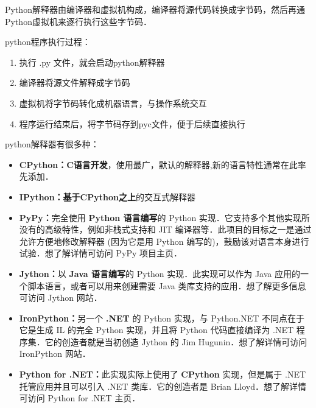 
\begin{issues}
\issueTODO
\end{issues}


Python解释器由编译器和虚拟机构成，编译器将源代码转换成字节码，然后再通Python虚拟机来逐行执行这些字节码．

python程序执行过程：

\begin{enumerate}
\item 执行 .py 文件，就会启动python解释器

\item 编译器将源文件解释成字节码

\item 虚拟机将字节码转化成机器语言，与操作系统交互

\item 程序运行结束后，将字节码存到pyc文件，便于后续直接执行
\end{enumerate}

python解释器有很多种：

\begin{itemize}
\item \textbf{CPython：}\textbf{C语言开发}，使用最广，默认的解释器,新的语言特性通常在此率先添加．

\item \textbf{IPython：}\textbf{基于CPython之上}的交互式解释器

\item \textbf{PyPy：}完全使用 \textbf{Python 语言编写}的 Python 实现．它支持多个其他实现所没有的高级特性，例如非栈式支持和 JIT 编译器等．此项目的目标之一是通过允许方便地修改解释器 (因为它是用 Python 编写的)，鼓励该对语言本身进行试验．想了解详情可访问 PyPy 项目主页．

\item \textbf{Jython：}以 \textbf{Java 语言编写}的 Python 实现．此实现可以作为 Java 应用的一个脚本语言，或者可以用来创建需要 Java 类库支持的应用．想了解更多信息可访问 Jython 网站．

\item \textbf{IronPython：}另一个 \textbf{.NET} 的 Python 实现，与 Python.NET 不同点在于它是生成 IL 的完全 Python 实现，并且将 Python 代码直接编译为 .NET 程序集．它的创造者就是当初创造 Jython 的 Jim Hugunin．想了解详情可访问 IronPython 网站．

\item \textbf{Python for .NET：}此实现实际上使用了 \textbf{CPython} 实现，但是属于 .NET 托管应用并且可以引入 .NET 类库．它的创造者是 Brian Lloyd．想了解详情可访问 Python for .NET 主页．
\end{itemize}